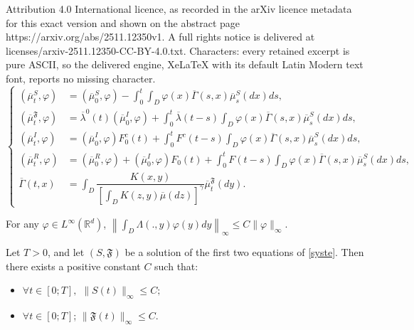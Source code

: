 \documentclass[10pt,a4paper]{amsart}
\begin{document}
Attribution 4.0 International licence, as recorded in the arXiv licence metadata for this exact version and shown on the abstract page https://arxiv.org/abs/2511.12350v1. A full rights notice is delivered at licenses/arxiv-2511.12350-CC-BY-4.0.txt. Characters: every retained excerpt is pure ASCII, so the delivered engine, XeLaTeX with its default Latin Modern text font, reports no missing character.
	\begin{equation}
	\label{sy}
	\left\lbrace
	\begin{aligned}
	(\overline{\mu}_t^{S},\varphi)&= (\overline{\mu}_0^{S},\varphi)- \int_0^t\int_{D}\varphi(x)\overline{\Gamma}(s,x)\overline{\mu}_s^{S}(dx)ds,\\
	(\overline{\mu}_t^{\mathfrak{F}},\varphi) &=\overline{\lambda}^0(t)(\overline{\mu}^I_0,\varphi)+\int_0^t\overline{\lambda}(t-s)\int_{D}\varphi(x)\overline{\Gamma}(s,x)\overline{\mu}_s^{S}(dx)ds,\\
	(\overline{\mu}_t^{I},\varphi)&= (\overline{\mu}_0^{I},\varphi)F_0^c(t)+\int_0^tF^c(t-s)\int_{D} \varphi (x)\overline{\Gamma}(s,x)\overline{\mu}_s^S(dx)ds,\\
	(\overline{\mu}_t^{R},\varphi)&=(\overline{\mu}_0^{R},\varphi)+ (\overline{\mu}_0^{I},\varphi)F_0(t)+\int_0^t F(t-s) \int_{D} \varphi (x)\overline{\Gamma}(s,x)\overline{\mu}_s^S(dx)ds,\\
	\overline{\Gamma}(t,x)&=\int_{D} \dfrac{K(x,y)}{\left[\displaystyle\int_{D}K(z,y)\overline{\mu}(dz) \right]^{\gamma}}\overline{\mu}_t^{\mathfrak{F}}(dy).
	\end{aligned}
	\right.
	\end{equation}	

\begin{lemma}
	\label{lem1}
For any $\varphi \in L^{\infty} (\mathbb{R}^d)$,  $\left \|\displaystyle \int_{D} \Lambda(.,y)\varphi(y)dy\right \|_{\infty}\leq C\|\varphi\|_{\infty}.$
\end{lemma}

\begin{lemma}
	\label{lem3}
	Let $T>0$, and let $(S,\mathfrak{F} )$  be a solution of the first two equations of \eqref{syste}. Then there exists a positive constant $C$ such that:
	\begin{itemize}
		\item $\forall t\in[0;T],$ $\|S(t)\|_{\infty}\leq C;$
		\item $\forall t\in[0;T]$; $\|\mathfrak{F}(t)\|_{\infty}\leq C.$
	\end{itemize}
\end{lemma}
\end{document}
